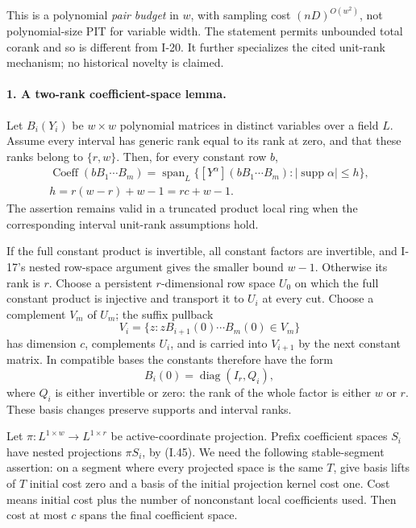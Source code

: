 This is a polynomial \emph{pair budget} in $w$, with
sampling cost $(nD)^{O(w^2)}$, not polynomial-size PIT for
variable width.  The statement permits unbounded total
corank and so is different from I-20.  It further specializes
the cited unit-rank mechanism; no historical novelty is claimed.

\paragraph{1. A two-rank coefficient-space lemma.}
Let $B_i(Y_i)$ be $w\times w$ polynomial matrices in distinct
variables over a field $L$.  Assume every interval has generic
rank equal to its rank at zero, and that these ranks belong
to $\{r,w\}$.  Then, for every constant row $b$,
\[
 \begin{gathered}
 \operatorname{Coeff}(bB_1\cdots B_m)
 =\operatorname{span}_L\{
       [Y^\alpha](bB_1\cdots B_m):
       |\operatorname{supp}\alpha|\le h\},\\
 h=r(w-r)+w-1=rc+w-1.
 \end{gathered}
 \tag{I.44}
\]
The assertion remains valid in a truncated product local ring
when the corresponding interval unit-rank assumptions hold.

If the full constant product is invertible, all constant
factors are invertible, and I-17's nested row-space argument
gives the smaller bound $w-1$.  Otherwise its rank is $r$.
Choose a persistent $r$-dimensional row space $U_0$ on which
the full constant product is injective and transport it to
$U_i$ at every cut.  Choose a complement $V_m$ of $U_m$;
the suffix pullback
\[
 V_i=\{z:zB_{i+1}(0)\cdots B_m(0)\in V_m\}
\]
has dimension $c$, complements $U_i$, and is carried into
$V_{i+1}$ by the next constant matrix.  In compatible bases
the constants therefore have the form
\[
 B_i(0)=\operatorname{diag}(I_r,Q_i),
 \tag{I.45}
\]
where $Q_i$ is either invertible or zero: the rank of the
whole factor is either $w$ or $r$.  These basis changes
preserve supports and interval ranks.

Let $\pi:L^{1\times w}\to L^{1\times r}$ be active-coordinate
projection.  Prefix coefficient spaces $S_i$ have nested
projections $\pi S_i$, by (I.45).
We need the following stable-segment assertion: on a segment
where every projected space is the same $T$, give basis lifts
of $T$ initial cost zero and a basis of the initial projection
kernel cost one.  Cost means initial cost plus the number of
nonconstant local coefficients used.  Then cost at most $c$
spans the final coefficient space.

